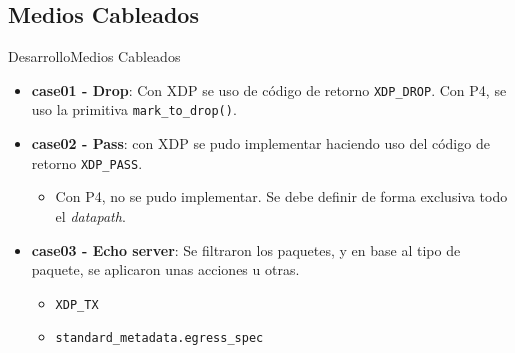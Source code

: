 \documentclass[10pt,compress,xcolor=table]{beamer} %
\newcommand{\cmark}{\ding{51}}%
\newcommand{\xmark}{\ding{55}}%
\begin{document}
\subsection{Medios Cableados}
\begin{frame}{Desarrollo}{Medios Cableados}
\begin{itemize}
    \item \textbf{case01 - Drop}: Con XDP se uso de código de retorno \texttt{XDP\_DROP}. Con P4, se uso la primitiva \texttt{mark\_to\_drop()}.\vspace{0.3cm}
    
    \item \textbf{case02 - Pass}: con XDP se pudo implementar haciendo uso del código de retorno \texttt{XDP\_PASS}.\vspace{0.2cm}
    \begin{itemize}
        \item[] \alert{\xmark} \hspace{0.1cm} Con P4, no se pudo implementar. Se debe definir de forma exclusiva todo el \textit{datapath}. 
    \end{itemize}\vspace{0.3cm}
    \item \textbf{case03 - Echo server}: Se filtraron los paquetes, y en base al tipo de paquete, se aplicaron unas acciones u otras.\vspace{0.2cm}
    \begin{itemize}
        \item[] \cmark  \hspace{0.1cm} \texttt{XDP\_TX}\vspace{0.1cm}
        \item[] \cmark  \hspace{0.1cm} \texttt{standard\_metadata.egress\_spec} 
    \end{itemize}
\end{itemize}
\end{frame}
\end{document}
